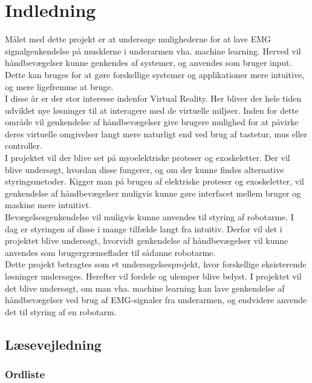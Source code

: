 \thispagestyle{fancy}
\chapter{Indledning}
\label{chp:indledning}
Målet med dette projekt er at undersøge mulighederne for at lave EMG signalgenkendelse på musklerne i underarmen vha. machine learning. Herved vil håndbevægelser kunne genkendes af systemer, og anvendes som bruger input. Dette kan bruges for at gøre forskellige systemer og applikationer mere intuitive, og mere ligefremme at bruge.\\

I disse år er der stor interesse indenfor Virtual Reality. Her bliver der hele tiden udviklet nye løsninger til at interagere med de virtuelle miljøer. Inden for dette område vil genkendelse af håndbevægelser give brugere mulighed for at påvirke deres virtuelle omgivelser langt mere naturligt end ved brug af tastetur, mus eller controller.\\

I projektet vil der blive set på myoelektriske proteser og exoskeletter. Der vil blive undersøgt, hvordan disse fungerer, og om der kunne findes alternative styringsmetoder.
Kigger man på brugen af elektriske proteser og exoskeletter, vil genkendelse af håndbevægelser muligvis kunne gøre interfacet mellem bruger og maskine mere intuitivt.\\

Bevægelsesgenkendelse vil muligvis kunne anvendes til styring af robotarme. I dag er styringen af disse i mange tilfælde langt fra intuitiv. Derfor vil det i projektet blive undersøgt, hvorvidt genkendelse af håndbevægelser vil kunne anvendes som brugergrænseflader til sådanne robotarme. \\

Dette projekt betragtes som et undersøgelsesprojekt, hvor forskellige eksisterende løsninger undersøges. Herefter vil fordele og ulemper blive belyst. I projektet vil det blive undersøgt, om man vha. machine learning kan lave genkendelse af håndbevægelser ved brug af EMG-signaler fra underarmen, og endvidere anvende det til styring af en robotarm.

\vfill

\section{Læsevejledning}
\subsection*{Ordliste}

